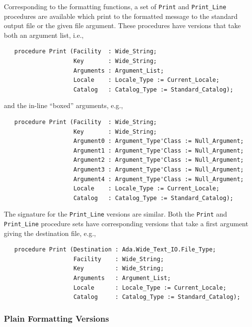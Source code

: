 Corresponding to the formatting functions, a set of \verb|Print| and
\verb|Print_Line| procedures are available which print to the formatted
message to the standard output file or the given file argument.  These
procedures have versions that take both an argument list, i.e.,
\begin{xmpl}
\begin{verbatim}
   procedure Print (Facility  : Wide_String;
                    Key       : Wide_String;
                    Arguments : Argument_List;
                    Locale    : Locale_Type := Current_Locale;
                    Catalog   : Catalog_Type := Standard_Catalog);
\end{verbatim}
\end{xmpl}
and the in-line ``boxed'' arguments, e.g.,
\begin{xmpl}
\begin{verbatim}
   procedure Print (Facility  : Wide_String;
                    Key       : Wide_String;
                    Argument0 : Argument_Type'Class := Null_Argument;
                    Argument1 : Argument_Type'Class := Null_Argument;
                    Argument2 : Argument_Type'Class := Null_Argument;
                    Argument3 : Argument_Type'Class := Null_Argument;
                    Argument4 : Argument_Type'Class := Null_Argument;
                    Locale    : Locale_Type := Current_Locale;
                    Catalog   : Catalog_Type := Standard_Catalog);
\end{verbatim}
\end{xmpl}
The signature for the \verb|Print_Line| versions are similar.  Both the
\verb|Print| and \verb|Print_Line| procedure sets have corresponding
versions that take a first argument giving the destination file, e.g.,
\begin{xmpl}
\begin{verbatim}
   procedure Print (Destination : Ada.Wide_Text_IO.File_Type;
                    Facility    : Wide_String;
                    Key         : Wide_String;
                    Arguments   : Argument_List;
                    Locale      : Locale_Type := Current_Locale;
                    Catalog     : Catalog_Type := Standard_Catalog);
\end{verbatim}
\end{xmpl}

\subsubsection{Plain Formatting Versions}

